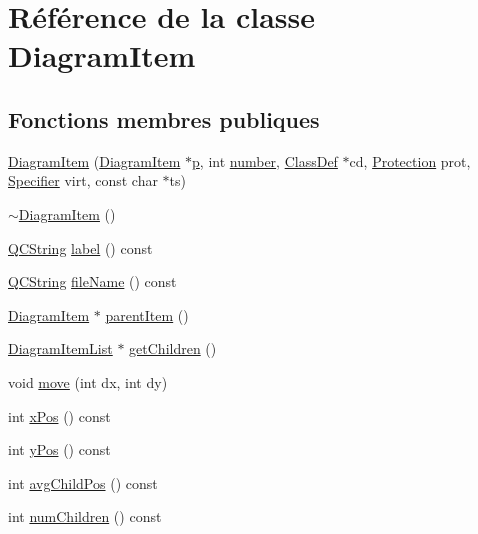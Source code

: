 \hypertarget{class_diagram_item}{}\section{Référence de la classe Diagram\+Item}
\label{class_diagram_item}
\subsection*{Fonctions membres publiques}
\begin{DoxyCompactItemize}
\item 
\hyperlink{class_diagram_item_a4387e041c010990d1ef23d104ea082fe}{Diagram\+Item} (\hyperlink{class_diagram_item}{Diagram\+Item} $\ast$\hyperlink{060__command__switch_8tcl_a15229b450f26d8fa1c10bea4f3279f4d}{p}, int \hyperlink{class_diagram_item_afe8624dd8e709eb37ea43a4832393595}{number}, \hyperlink{class_class_def}{Class\+Def} $\ast$cd, \hyperlink{types_8h_a90e352184df58cd09455fe9996cd4ded}{Protection} prot, \hyperlink{types_8h_ab16236bdd10ddf4d73a9847350f0017e}{Specifier} virt, const char $\ast$ts)
\item 
\hyperlink{class_diagram_item_a28a42a62623db060c81d1c1f20062980}{$\sim$\+Diagram\+Item} ()
\item 
\hyperlink{class_q_c_string}{Q\+C\+String} \hyperlink{class_diagram_item_a48fbedab12c8a15d132e199153f48f3f}{label} () const 
\item 
\hyperlink{class_q_c_string}{Q\+C\+String} \hyperlink{class_diagram_item_a09c408ec4cb5762a843125723ff1c4b4}{file\+Name} () const 
\item 
\hyperlink{class_diagram_item}{Diagram\+Item} $\ast$ \hyperlink{class_diagram_item_ab2289efb497a6181accc11324b2007bb}{parent\+Item} ()
\item 
\hyperlink{class_diagram_item_list}{Diagram\+Item\+List} $\ast$ \hyperlink{class_diagram_item_a30aa024181c7ddd574492cfce67cc19e}{get\+Children} ()
\item 
void \hyperlink{class_diagram_item_aca2295801c4b08a1565e86da1c04c242}{move} (int dx, int dy)
\item 
int \hyperlink{class_diagram_item_afd98db9ecb3770cf71c2f1b0c4394465}{x\+Pos} () const 
\item 
int \hyperlink{class_diagram_item_ab8b6d897595c3402ddcd013e7ebec541}{y\+Pos} () const 
\item 
int \hyperlink{class_diagram_item_a06dfc36ac9ff18b07a882762da9bd71d}{avg\+Child\+Pos} () const 
\item 
int \hyperlink{class_diagram_item_a2cf0c86abbac20e140f779aebfc6a6b1}{num\+Children} () const 

\end{DoxyCompactItemize}
